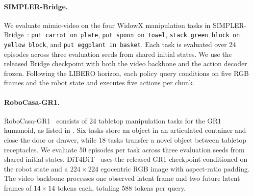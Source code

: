\paragraph{SIMPLER-Bridge.}
    We evaluate mimic-video on the four WidowX manipulation tasks in SIMPLER-Bridge~\cite{li2024simpler}: \texttt{put carrot on plate}, \texttt{put spoon on towel}, \texttt{stack green block on yellow block}, and \texttt{put eggplant in basket}.
    Each task is evaluated over 24 episodes across three evaluation seeds from shared initial states.
    We use the released Bridge checkpoint with both the video backbone and the action decoder frozen.
    Following the LIBERO horizon, each policy query conditions on five RGB frames and the robot state and executes five actions per chunk.

\paragraph{RoboCasa-GR1.}
    RoboCasa-GR1~\cite{nasiriany2024robocasa} consists of 24 tabletop manipulation tasks for the GR1 humanoid, as listed in .
    Six tasks store an object in an articulated container and close the door or drawer, while 18 tasks transfer a novel object between tabletop receptacles.
    We evaluate 50 episodes per task across three evaluation seeds from shared initial states.
    DiT4DiT~\cite{ma2026dit4dit} uses the released GR1 checkpoint conditioned on the robot state and a $224\times 224$ egocentric RGB image with aspect-ratio padding.
    The video backbone processes one observed latent frame and two future latent frames of $14\times 14$ tokens each, totaling 588 tokens per query.




